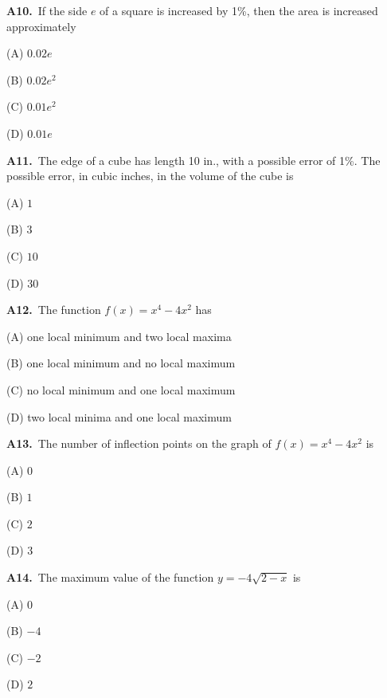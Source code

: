 \documentclass[11pt]{article}
\begin{document}
\bigskip\noindent\textbf{A10.}\ If the side $e$ of a square is increased by 1\%, then the area is increased approximately
\begin{list}{}{\setlength{\leftmargin}{3em}\setlength{\labelwidth}{2.5em}\setlength{\itemsep}{0pt}\setlength{\topsep}{2pt}}
\item[(A)] $0.02e$
\item[(B)] $0.02e^2$
\item[(C)] $0.01e^2$
\item[(D)] $0.01e$
\end{list}

\bigskip\noindent\textbf{A11.}\ The edge of a cube has length 10 in., with a possible error of 1\%. The possible error, in cubic inches, in the volume of the cube is
\begin{list}{}{\setlength{\leftmargin}{3em}\setlength{\labelwidth}{2.5em}\setlength{\itemsep}{0pt}\setlength{\topsep}{2pt}}
\item[(A)] $1$
\item[(B)] $3$
\item[(C)] $10$
\item[(D)] $30$
\end{list}

\bigskip\noindent\textbf{A12.}\ The function $f(x) = x^4 - 4x^2$ has
\begin{list}{}{\setlength{\leftmargin}{3em}\setlength{\labelwidth}{2.5em}\setlength{\itemsep}{0pt}\setlength{\topsep}{2pt}}
\item[(A)] one local minimum and two local maxima
\item[(B)] one local minimum and no local maximum
\item[(C)] no local minimum and one local maximum
\item[(D)] two local minima and one local maximum
\end{list}

\bigskip\noindent\textbf{A13.}\ The number of inflection points on the graph of $f(x) = x^4 - 4x^2$ is
\begin{list}{}{\setlength{\leftmargin}{3em}\setlength{\labelwidth}{2.5em}\setlength{\itemsep}{0pt}\setlength{\topsep}{2pt}}
\item[(A)] $0$
\item[(B)] $1$
\item[(C)] $2$
\item[(D)] $3$
\end{list}

\bigskip\noindent\textbf{A14.}\ The maximum value of the function $y = -4\sqrt{2-x}$ is
\begin{list}{}{\setlength{\leftmargin}{3em}\setlength{\labelwidth}{2.5em}\setlength{\itemsep}{0pt}\setlength{\topsep}{2pt}}
\item[(A)] $0$
\item[(B)] $-4$
\item[(C)] $-2$
\item[(D)] $2$
\end{list}
\end{document}
